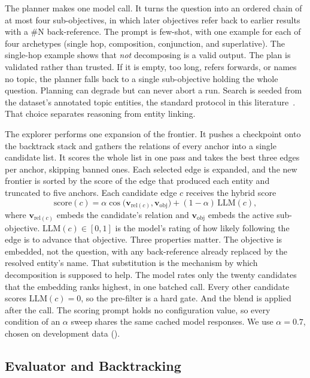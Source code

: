 The planner makes one model call. It turns the question into an ordered chain of
at most four sub-objectives, in which later objectives refer back to earlier
results with a \textsf{\#N} back-reference. The prompt is few-shot, with one
example for each of four archetypes (single hop, composition, conjunction, and
superlative). The single-hop example shows that \emph{not} decomposing is a
valid output. The plan is validated rather than trusted. If it is empty, too
long, refers forwards, or names no topic, the planner falls back to a single
sub-objective holding the whole question. Planning can degrade but can never
abort a run. Search is seeded from the dataset's annotated topic entities, the
standard protocol in this literature~\cite{sun2024think,luo2024reasoning}. That
choice separates reasoning from entity linking.

The explorer performs one expansion of the frontier. It pushes a checkpoint onto
the backtrack stack and gathers the relations of every anchor into a single
candidate list. It scores the whole list in one pass and takes the best three
edges per anchor, skipping banned ones. Each selected edge is expanded, and the
new frontier is sorted by the score of the edge that produced each entity and
truncated to five anchors. Each candidate edge $c$ receives the hybrid score
\begin{equation}\label{eq:score}
\mathrm{score}(c) = \alpha \cos\big(\mathbf{v}_{\mathrm{rel}(c)},
\mathbf{v}_{\mathrm{obj}}\big) + (1-\alpha)\,\mathrm{LLM}(c),
\end{equation}
where $\mathbf{v}_{\mathrm{rel}(c)}$ embeds the candidate's relation and
$\mathbf{v}_{\mathrm{obj}}$ embeds the active sub-objective. $\mathrm{LLM}(c)
\in [0,1]$ is the model's rating of how likely following the edge is to advance
that objective. Three properties matter. The objective is embedded, not the
question, with any back-reference already replaced by the resolved entity's
name. That substitution is the mechanism by which decomposition is supposed to
help. The model rates only the twenty candidates that the embedding ranks
highest, in one batched call. Every other candidate scores $\mathrm{LLM}(c) =
0$, so the pre-filter is a hard gate. And the blend is applied after the call.
The scoring prompt holds no configuration value, so every condition of an
$\alpha$ sweep shares the same cached model responses. We use $\alpha = 0.7$,
chosen on development data ().

\subsection{Evaluator and Backtracking}

